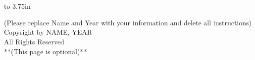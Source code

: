 

\chapter*{}

\thispagestyle{empty}

\vbox to 3.75in{}
\begin{center}
(Please replace Name and Year with your information and delete all instructions) \\
Copyright by NAME, YEAR \\[-11pt]
All Rights Reserved \\

**(This page is optional)**
\end{center}

\newpage

